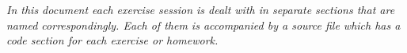 \documentclass{res/theme}
\subtitle{Bruno Vandekerkhove}
\date{}
\begin{document}
\maketitle


\begin{center}\textit{In this document each exercise session is dealt with in separate sections that are named correspondingly. Each of them is accompanied by a source file which has a code section for each exercise or homework.}\end{center}

\tableofcontents

\newpage
\newpage
\newpage

\end{document}
